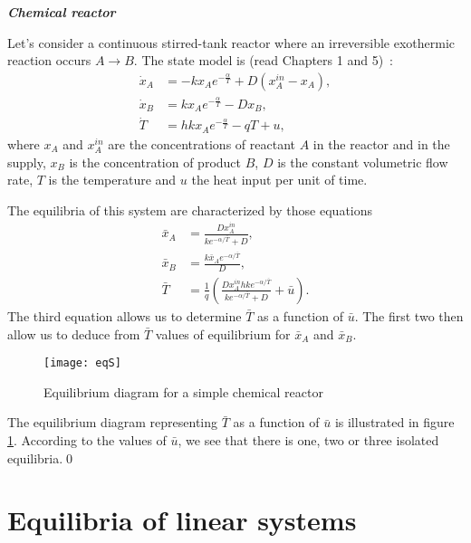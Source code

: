 \begin{exemple}{\bf{\em Chemical reactor}}

Let's consider a continuous stirred-tank reactor where an irreversible exothermic reaction occurs 
$A \longrightarrow B$. The state model is (read Chapters 1 and 5)~:
\begin{equation*} \begin{split} 
\dot x_A &= -kx_A e^{-\frac{\alpha}{T}}+D(x_A^{in}-x_{A}),\\
\dot x_{B} &= kx_{A} e^{-\frac{\alpha}{T}}-D x_{B},\\
\dot T &= hkx_{A} e^{-\frac{\alpha}{T}}-qT+u,
\end{split} \end{equation*}
where $x_{A}$ and $x_{A}^{in}$ are the concentrations of reactant $A$
in the reactor and in the supply, $x_B$ is the concentration of product $B$, $D$ is the constant volumetric flow rate,
$T$ is the temperature and $u$ the heat input per unit of time.

The equilibria of this system are characterized by those equations
\begin{equation*} \begin{split}
\bar x_{A}&=\frac{Dx_{A}^{in}}{k e^{-\alpha/\bar T}+D}, \\
\bar x_{B}&=\frac{k \bar x_{A} e^{-\alpha/\bar T}}{D}, \\
\bar T&=\frac{1}{q}\left(\frac{Dx_{A}^{in}hk  e^{-\alpha/\bar T}}{k
 e^{-\alpha/\bar T}+D} + \bar u \right).
\end{split} \end{equation*}
The third equation allows us to determine $\bar T$ as a function of $\bar u$. The first two then allow us to deduce from $\bar T$ values of equilibrium for $\bar x_{A}$ and $\bar x_{B}$. 
\begin{figure}[h]
\begin{center}
\texttt{[image: eqS]}
\caption{Equilibrium diagram for a simple chemical reactor}
\label{fig:eqS}
\end{center} 
\vspace{-5mm}
\end{figure}
The equilibrium diagram representing $\bar T$ as a function of $\bar u$ is illustrated in figure \ref{fig:eqS}.
According to the values of $\bar u$, we see that there is one, two or three isolated equilibria.\qed
\end{exemple}

\section{Equilibria of linear systems} 


